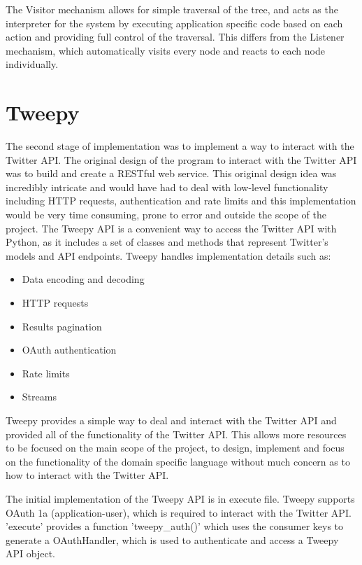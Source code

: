The Visitor mechanism allows for simple traversal of the tree, and acts as the interpreter for the system by executing application specific code based on each action and providing full control of the traversal. This differs from the Listener mechanism, which automatically visits every node and reacts to each node individually.

\section{Tweepy}

The second stage of implementation was to implement a way to interact with the Twitter API. The original design of the program to interact with the Twitter API was to build and create a RESTful web service. This original design idea was incredibly intricate and would have had to deal with low-level functionality including HTTP requests, authentication and rate limits and this implementation would be very time consuming, prone to error and outside the scope of the project. The Tweepy API is a convenient way to access the Twitter API with Python, as it includes a set of classes and methods that represent Twitter's models and API endpoints. Tweepy handles implementation details such as:
\begin{itemize}
    \item Data encoding and decoding
    \item HTTP requests
    \item Results pagination
    \item OAuth authentication
    \item Rate limits
    \item Streams
\end{itemize}
Tweepy provides a simple way to deal and interact with the Twitter API and provided all of the functionality of the Twitter API. This allows more resources to be focused on the main scope of the project, to design, implement and focus on the functionality of the domain specific language without much concern as to how to interact with the Twitter API. \newline \par

The initial implementation of the Tweepy API is in execute file. Tweepy supports OAuth 1a (application-user), which is required to interact with the Twitter API. 'execute' provides a function 'tweepy\_auth()' which uses the consumer keys to generate a OAuthHandler, which is used to authenticate and access a Tweepy API object. \newline \par


